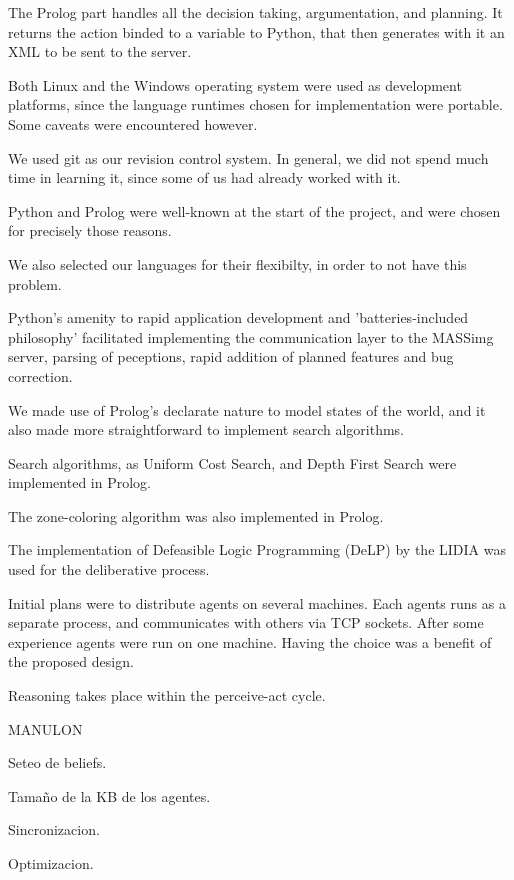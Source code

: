 \documentclass{llncs2e/llncs}
\begin{document}
    The Prolog part handles all the decision taking, argumentation, and planning. 
    It returns the action binded to a variable to Python, that then generates with 
    it an XML to be sent to the server.

    Both Linux and the Windows operating system were used as development 
    platforms, since the language runtimes chosen for implementation were 
    portable. Some caveats were encountered however.

    We used git as our revision control system. In general, we did not spend much 
    time in learning it, since some of us had already worked with it.

    Python and Prolog were well-known at the start of the project, and were chosen 
    for precisely those reasons.

    We also selected our languages for their flexibilty, in order to not have this 
    problem.

    Python's amenity to rapid application development and 'batteries-included 
    philosophy' facilitated implementing the communication layer to the MASSimg 
    server, parsing of peceptions, rapid addition of planned features and bug 
    correction.

    We made use of Prolog's declarate nature to model states of the world, and it 
    also made more straightforward to implement search algorithms.

    Search algorithms, as Uniform Cost Search, and Depth First Search were 
    implemented in Prolog.

    The zone-coloring algorithm was also implemented in Prolog.

    The implementation of Defeasible Logic Programming (DeLP) by the LIDIA was 
    used for the deliberative process.

    Initial plans were to distribute agents on several machines. Each agents runs 
    as a separate process, and communicates with others via TCP sockets. After 
    some experience agents were run on one machine. Having the choice was a 
    benefit of the proposed design.

    Reasoning takes place within the perceive-act cycle.

    MANULON

    Seteo de beliefs.

    Tamaño de la KB de los agentes.

    Sincronizacion.

    Optimizacion.
\end{document}
